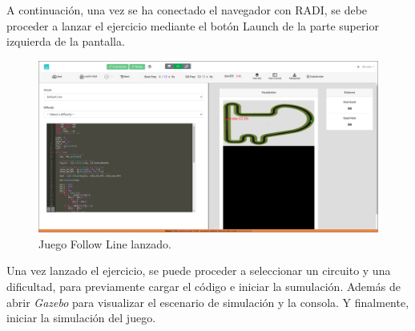 \documentclass[a4paper, 12pt]{book}
\begin{document}
A continuación, una vez se ha conectado el navegador con RADI, se debe proceder a lanzar el ejercicio mediante el botón Launch de la parte superior izquierda de la pantalla.

\begin{figure}[H]
	\centering
    \includegraphics[width=12cm]{img/fl_connection_established.png}
    \caption{Juego Follow Line lanzado.}
\end{figure}

Una vez lanzado el ejercicio, se puede proceder a seleccionar un circuito y una dificultad, para previamente cargar el código e iniciar la sumulación. Además de abrir \emph{Gazebo} para visualizar el escenario de simulación y la consola. Y finalmente, iniciar la simulación del juego.
\end{document}
